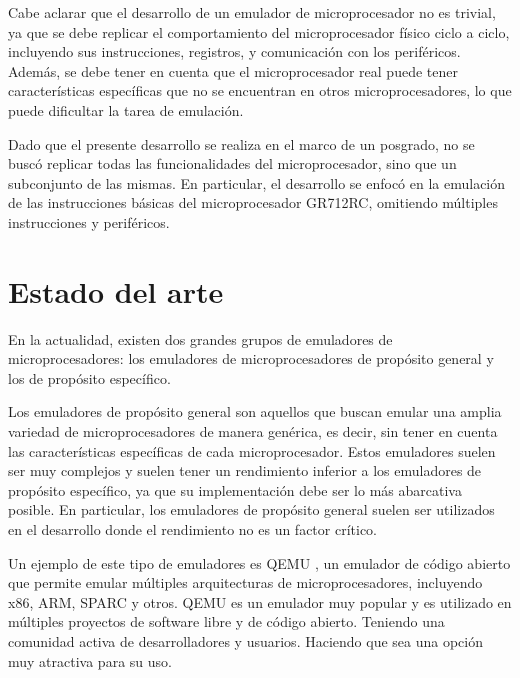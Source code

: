 
\vspace{1cm}

\newpage

Cabe aclarar que el desarrollo de un emulador de microprocesador no es trivial, ya que se debe replicar el comportamiento del microprocesador físico ciclo a ciclo, incluyendo sus instrucciones, registros, y comunicación con los periféricos. Además, se debe tener en cuenta que el microprocesador real puede tener características específicas que no se encuentran en otros microprocesadores, lo que puede dificultar la tarea de emulación.

Dado que el presente desarrollo se realiza en el marco de un posgrado, no se buscó replicar todas las funcionalidades del microprocesador, sino que un subconjunto de las mismas. En particular, el desarrollo se enfocó en la emulación de las instrucciones básicas del microprocesador GR712RC, omitiendo múltiples instrucciones y periféricos.

\section{Estado del arte}
\label{sec:estado_arte}

En la actualidad, existen dos grandes grupos de emuladores de microprocesadores: los emuladores de microprocesadores de propósito general y los de propósito específico.

Los emuladores de propósito general son aquellos que buscan emular una amplia variedad de microprocesadores de manera genérica, es decir, sin tener en cuenta las características específicas de cada microprocesador. Estos emuladores suelen ser muy complejos y suelen tener un rendimiento inferior a los emuladores de propósito específico, ya que su implementación debe ser lo más abarcativa posible. En particular, los emuladores de propósito general suelen ser utilizados en el desarrollo donde el rendimiento no es un factor crítico.

Un ejemplo de este tipo de emuladores es QEMU \citep{QEMU}, un emulador de código abierto que permite emular múltiples arquitecturas de microprocesadores, incluyendo x86, ARM, SPARC y otros. QEMU es un emulador muy popular y es utilizado en múltiples proyectos de software libre y de código abierto. Teniendo una comunidad activa de desarrolladores y usuarios. Haciendo que sea una opción muy atractiva para su uso.

